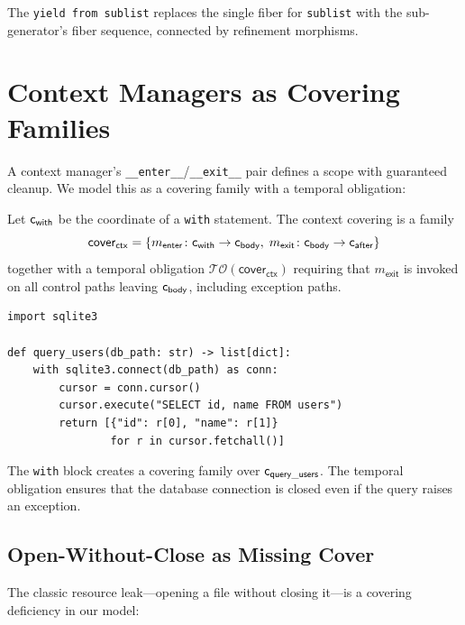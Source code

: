 \documentclass[11pt]{article}
\newcommand{\cover}{\mathsf{cover}}      %
\newcommand{\tempoblig}{\mathcal{T\!O}}  %
\begin{document}
The \texttt{yield from sublist} replaces the single fiber for
\texttt{sublist} with the sub-generator's fiber sequence, connected
by refinement morphisms.

\section{Context Managers as Covering Families}\label{sec:context}

A context manager's \texttt{\_\_enter\_\_}/\texttt{\_\_exit\_\_} pair
defines a scope with guaranteed cleanup.  We model this as a covering
family with a temporal obligation:

\begin{definition}\label{def:ctx-cover}
Let $\mathsf{c}_{\mathsf{with}}$ be the coordinate of a \texttt{with}
statement.  The context covering is a family
\[
  \cover_{\mathsf{ctx}} = \{
    m_{\mathsf{enter}} \colon \coord_{\mathsf{with}} \to \coord_{\mathsf{body}},\;
    m_{\mathsf{exit}} \colon \coord_{\mathsf{body}} \to \coord_{\mathsf{after}}
  \}
\]
together with a temporal obligation
$\tempoblig(\cover_{\mathsf{ctx}})$ requiring that
$m_{\mathsf{exit}}$ is invoked on all control paths leaving
$\mathsf{c}_{\mathsf{body}}$, including exception paths.
\end{definition}

\begin{lstlisting}[style=jugeo-python,caption={Context manager for database connection.}]
import sqlite3

def query_users(db_path: str) -> list[dict]:
    with sqlite3.connect(db_path) as conn:
        cursor = conn.cursor()
        cursor.execute("SELECT id, name FROM users")
        return [{"id": r[0], "name": r[1]}
                for r in cursor.fetchall()]
\end{lstlisting}

The \texttt{with} block creates a covering family over
$\mathsf{c}_{\mathsf{query\_users}}$.  The temporal obligation ensures
that the database connection is closed even if the query raises an
exception.

\subsection{Open-Without-Close as Missing Cover}

The classic resource leak---opening a file without closing it---is
a covering deficiency in our model:
\end{document}
